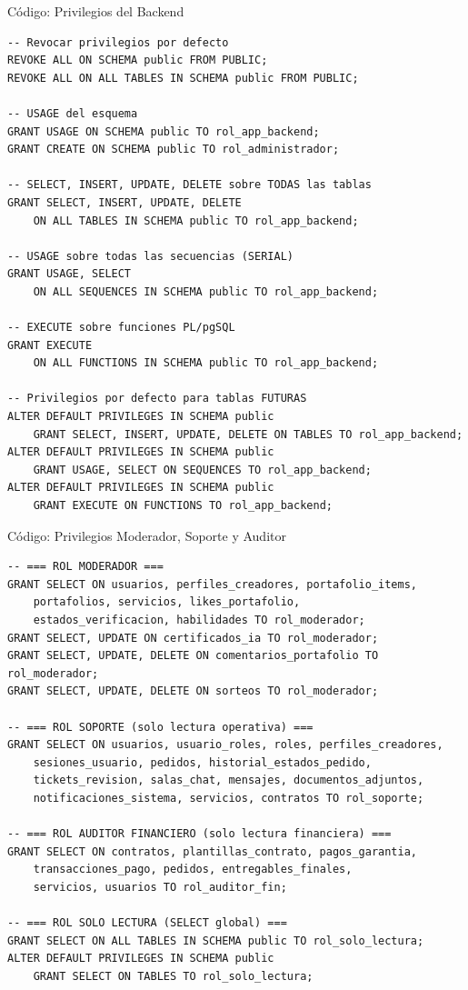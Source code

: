 \documentclass[aspectratio=169]{beamer}
\begin{document}
\begin{frame}{Código: Privilegios del Backend}
    \begin{lstlisting}[title={DML completo para rol\_app\_backend}]
-- Revocar privilegios por defecto
REVOKE ALL ON SCHEMA public FROM PUBLIC;
REVOKE ALL ON ALL TABLES IN SCHEMA public FROM PUBLIC;

-- USAGE del esquema
GRANT USAGE ON SCHEMA public TO rol_app_backend;
GRANT CREATE ON SCHEMA public TO rol_administrador;

-- SELECT, INSERT, UPDATE, DELETE sobre TODAS las tablas
GRANT SELECT, INSERT, UPDATE, DELETE
    ON ALL TABLES IN SCHEMA public TO rol_app_backend;

-- USAGE sobre todas las secuencias (SERIAL)
GRANT USAGE, SELECT
    ON ALL SEQUENCES IN SCHEMA public TO rol_app_backend;

-- EXECUTE sobre funciones PL/pgSQL
GRANT EXECUTE
    ON ALL FUNCTIONS IN SCHEMA public TO rol_app_backend;

-- Privilegios por defecto para tablas FUTURAS
ALTER DEFAULT PRIVILEGES IN SCHEMA public
    GRANT SELECT, INSERT, UPDATE, DELETE ON TABLES TO rol_app_backend;
ALTER DEFAULT PRIVILEGES IN SCHEMA public
    GRANT USAGE, SELECT ON SEQUENCES TO rol_app_backend;
ALTER DEFAULT PRIVILEGES IN SCHEMA public
    GRANT EXECUTE ON FUNCTIONS TO rol_app_backend;
    \end{lstlisting}
\end{frame}

\begin{frame}{Código: Privilegios Moderador, Soporte y Auditor}
    \begin{lstlisting}[title={Privilegios granulares por rol}]
-- === ROL MODERADOR ===
GRANT SELECT ON usuarios, perfiles_creadores, portafolio_items,
    portafolios, servicios, likes_portafolio,
    estados_verificacion, habilidades TO rol_moderador;
GRANT SELECT, UPDATE ON certificados_ia TO rol_moderador;
GRANT SELECT, UPDATE, DELETE ON comentarios_portafolio TO rol_moderador;
GRANT SELECT, UPDATE, DELETE ON sorteos TO rol_moderador;

-- === ROL SOPORTE (solo lectura operativa) ===
GRANT SELECT ON usuarios, usuario_roles, roles, perfiles_creadores,
    sesiones_usuario, pedidos, historial_estados_pedido,
    tickets_revision, salas_chat, mensajes, documentos_adjuntos,
    notificaciones_sistema, servicios, contratos TO rol_soporte;

-- === ROL AUDITOR FINANCIERO (solo lectura financiera) ===
GRANT SELECT ON contratos, plantillas_contrato, pagos_garantia,
    transacciones_pago, pedidos, entregables_finales,
    servicios, usuarios TO rol_auditor_fin;

-- === ROL SOLO LECTURA (SELECT global) ===
GRANT SELECT ON ALL TABLES IN SCHEMA public TO rol_solo_lectura;
ALTER DEFAULT PRIVILEGES IN SCHEMA public
    GRANT SELECT ON TABLES TO rol_solo_lectura;
    \end{lstlisting}
\end{frame}
\end{document}
